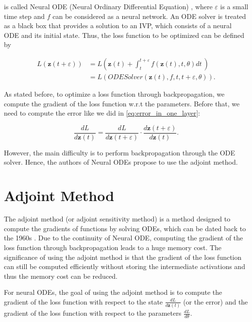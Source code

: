 \documentclass[
	parskip, 			   %
	twoside, 			   %
	DIV=14, 			   %
	BCOR=15.0mm, 		   %
	headsepline, 		   %
	open=right, 		   %
	captions=tableheading, %
	bibliography=totoc,    %
	numbers=noenddot       %
]{scrreprt}
\begin{document}
is called Neural ODE (Neural Ordinary Differential Equation) \cite{chen2018neural}, where $\varepsilon $ is a small time step and $f$ can be considered as a neural network. An ODE solver is treated as a black box that provides a solution to an IVP, which consists of a neural ODE and its initial state. Thus, the loss function to be optimized can be defined by

\begin{equation}
    \label{eq:Neural_ODE_Gradient_loss}
    \begin{aligned}
    L(\mathbf{z}(t+\varepsilon )) &= L(\mathbf{z}(t) + \int_{t}^{t+\varepsilon } f(\mathbf{z}(t), t, \theta)dt \:)\\
    &= L(ODESolver(\mathbf{z}(t), f, t, t+\varepsilon , \theta)).
    \end{aligned}
\end{equation}

As stated before, to optimize a loss function through backpropagation, we compute the gradient of the loss function w.r.t the parameters. Before that, we need to compute the error like we did in \ref{eq:error_in_one_layer}:

\begin{equation}
    \label{eq:Neural_ODE_error}
    \frac{d L}{d\mathbf{z}(t)} = \frac{d L}{d\mathbf{z}(t+\varepsilon )} \cdot \frac{d\mathbf{z}(t+\varepsilon )}{d\mathbf{z}(t)}.
\end{equation}

However, the main difficulty is to perform backpropagation through the ODE solver. Hence, the authors of Neural ODEs propose to use the adjoint method.


\section{Adjoint Method}
The adjoint method (or adjoint sensitivity method) is a method designed to compute the gradients of functions by solving ODEs, which can be dated back to the 1960s \cite{boltyanskiy1962mathematical}. Due to the continuity of Neural ODE, computing the gradient of the loss function through backpropagation leads to a huge memory cost. The significance of using the adjoint method is that the gradient of the loss function can still be computed efficiently without storing the intermediate activations and thus the memory cost can be reduced.

For neural ODEs, the goal of using the adjoint method is to compute the gradient of the loss function with respect to the state $\frac{d L}{d\mathbf{z}(t)}$ (or the error) and the gradient of the loss function with respect to the parameters $\frac{d L}{d\theta}$.
\end{document}
